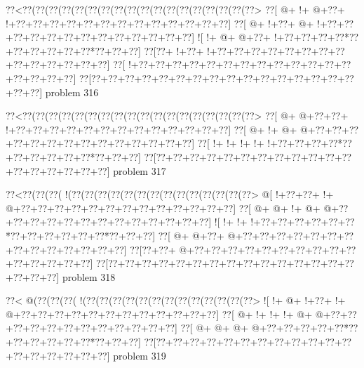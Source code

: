 \vbox{\vbox{\goo
\0??<\0??(\0??(\0??(\0??(\0??(\0??(\0??(\0??(\0??(\0??(\0??(\0??(\0??(\0??(\0??(\0??(\0??(\0??>
\0??[\- @+\- !+\- @+\0??+\- !+\0??+\0??+\0??+\0??+\0??+\0??+\0??+\0??+\0??+\0??+\0??+\0??+\0??]
\0??[\- @+\- !+\0??+\- @+\- !+\0??+\0??+\0??+\0??+\0??+\0??+\0??+\0??+\0??+\0??+\0??+\0??+\0??]
\- ![\- !+\- @+\- @+\0??+\- !+\0??+\0??+\0??+\0??*\0??+\0??+\0??+\0??+\0??+\0??*\0??+\0??+\0??]
\0??[\0??+\- !+\0??+\- !+\0??+\0??+\0??+\0??+\0??+\0??+\0??+\0??+\0??+\0??+\0??+\0??+\0??+\0??]
\0??[\- !+\0??+\0??+\0??+\0??+\0??+\0??+\0??+\0??+\0??+\0??+\0??+\0??+\0??+\0??+\0??+\0??+\0??]
\0??[\0??+\0??+\0??+\0??+\0??+\0??+\0??+\0??+\0??+\0??+\0??+\0??+\0??+\0??+\0??+\0??+\0??+\0??]
}
\hfil problem 316\hfil\break
}



\vbox{\vbox{\goo
\0??<\0??(\0??(\0??(\0??(\0??(\0??(\0??(\0??(\0??(\0??(\0??(\0??(\0??(\0??(\0??(\0??(\0??(\0??>
\0??[\- @+\- @+\0??+\0??+\- !+\0??+\0??+\0??+\0??+\0??+\0??+\0??+\0??+\0??+\0??+\0??+\0??+\0??]
\0??[\- @+\- !+\- @+\- @+\0??+\0??+\0??+\0??+\0??+\0??+\0??+\0??+\0??+\0??+\0??+\0??+\0??+\0??]
\0??[\- !+\- !+\- !+\- !+\- !+\0??+\0??+\0??+\0??*\0??+\0??+\0??+\0??+\0??+\0??*\0??+\0??+\0??]
\0??[\0??+\0??+\0??+\0??+\0??+\0??+\0??+\0??+\0??+\0??+\0??+\0??+\0??+\0??+\0??+\0??+\0??+\0??]
}
\hfil problem 317\hfil\break
}



\vbox{\vbox{\goo
\0??<\0??(\0??(\0??(\- !(\0??(\0??(\0??(\0??(\0??(\0??(\0??(\0??(\0??(\0??(\0??(\0??(\0??(\0??>
\- @[\- !+\0??+\0??+\- !+\- @+\0??+\0??+\0??+\0??+\0??+\0??+\0??+\0??+\0??+\0??+\0??+\0??+\0??]
\0??[\- @+\- @+\- !+\- @+\- @+\0??+\0??+\0??+\0??+\0??+\0??+\0??+\0??+\0??+\0??+\0??+\0??+\0??]
\- ![\- !+\- !+\- !+\0??+\0??+\0??+\0??+\0??+\0??*\0??+\0??+\0??+\0??+\0??+\0??*\0??+\0??+\0??]
\0??[\- @+\- @+\0??+\- @+\0??+\0??+\0??+\0??+\0??+\0??+\0??+\0??+\0??+\0??+\0??+\0??+\0??+\0??]
\0??[\0??+\0??+\- @+\0??+\0??+\0??+\0??+\0??+\0??+\0??+\0??+\0??+\0??+\0??+\0??+\0??+\0??+\0??]
\0??[\0??+\0??+\0??+\0??+\0??+\0??+\0??+\0??+\0??+\0??+\0??+\0??+\0??+\0??+\0??+\0??+\0??+\0??]
}
\hfil problem 318\hfil\break
}



\vbox{\vbox{\goo
\0??<\- @(\0??(\0??(\0??(\- !(\0??(\0??(\0??(\0??(\0??(\0??(\0??(\0??(\0??(\0??(\0??(\0??(\0??>
\- ![\- !+\- @+\- !+\0??+\- !+\- @+\0??+\0??+\0??+\0??+\0??+\0??+\0??+\0??+\0??+\0??+\0??+\0??]
\0??[\- @+\- !+\- !+\- !+\- @+\- @+\0??+\0??+\0??+\0??+\0??+\0??+\0??+\0??+\0??+\0??+\0??+\0??]
\0??[\- @+\- @+\- @+\- @+\0??+\0??+\0??+\0??+\0??*\0??+\0??+\0??+\0??+\0??+\0??*\0??+\0??+\0??]
\0??[\0??+\0??+\0??+\0??+\0??+\0??+\0??+\0??+\0??+\0??+\0??+\0??+\0??+\0??+\0??+\0??+\0??+\0??]
}
\hfil problem 319\hfil\break
}



